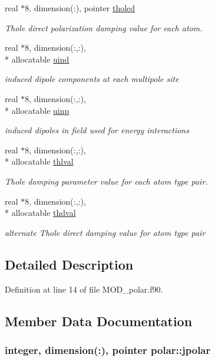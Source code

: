 \begin{DoxyCompactItemize}
real $\ast$8, dimension(\-:), pointer \hyperlink{classpolar_a1f36ef991cd55ae13502480f6b4fd3e4}{tholed}
\begin{DoxyCompactList}\small\item\em Thole direct polarization damping value for each atom. \end{DoxyCompactList}\item 
real $\ast$8, dimension(\-:,\-:), \\*
allocatable \hyperlink{classpolar_a14c2aa74b13c1c6313c7efb2400c2959}{uind}
\begin{DoxyCompactList}\small\item\em induced dipole components at each multipole site \end{DoxyCompactList}\item 
real $\ast$8, dimension(\-:,\-:), \\*
allocatable \hyperlink{classpolar_ab5ed650307b23a70ff6800e88ea64395}{uinp}
\begin{DoxyCompactList}\small\item\em induced dipoles in field used for energy interactions \end{DoxyCompactList}\item 
real $\ast$8, dimension(\-:,\-:), \\*
allocatable \hyperlink{classpolar_a3aac24400014242cf0ce82229938a499}{thlval}
\begin{DoxyCompactList}\small\item\em Thole damping parameter value for each atom type pair. \end{DoxyCompactList}\item 
real $\ast$8, dimension(\-:,\-:), \\*
allocatable \hyperlink{classpolar_a1e698423d3f909c74679eedcb706b3a0}{thdval}
\begin{DoxyCompactList}\small\item\em alternate Thole direct damping value for atom type pair \end{DoxyCompactList}\end{DoxyCompactItemize}


\subsection{Detailed Description}


Definition at line 14 of file M\-O\-D\-\_\-polar.\-f90.



\subsection{Member Data Documentation}
\hypertarget{classpolar_acb04e27fba4c3f599042c07f6f5c280e}{
\subsubsection[{jpolar}]{\setlength{\rightskip}{0pt plus 5cm}integer, dimension(\-:), pointer polar\-::jpolar}}\label{classpolar_acb04e27fba4c3f599042c07f6f5c280e}


